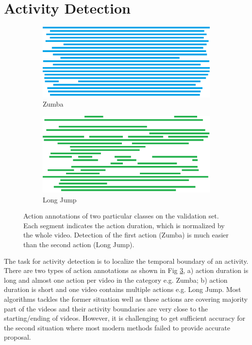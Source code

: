 \section{Activity Detection}
\label{sec:activity_detection}

\begin{figure}
    \centering
    \begin{subfigure}{1\textwidth}
        \includegraphics[width=1\linewidth]{resources/Human_Poses/Zumba}
        \caption{Zumba}
        \label{fig:subfig1}
    \end{subfigure}

    \begin{subfigure}{1\textwidth}
        \includegraphics[width=1\linewidth]{resources/Human_Poses/Long_jump}
        \caption{Long Jump}
        \label{fig:subfig2}
    \end{subfigure}
 \caption{Action annotations of two particular classes on the validation set. Each segment indicates the action duration, which is normalized by the whole video. Detection of the first action (Zumba) is much easier than the second action (Long Jump).}
 
\label{fig:seg} %
\end{figure}

The task for activity detection is to localize the temporal boundary of an activity. There are two types of action annotations as shown in Fig \ref{fig:seg}, a) action duration is long and almost one action per video in the category e.g. Zumba; b) action duration is short and one video contains multiple actions e.g. Long Jump. Most algorithms tackles the former situation well as these actions are covering majority part of the videos and their activity boundaries are very close to the starting/ending of videos. However, it is challenging to get sufficient accuracy for the second situation where most modern methods failed to provide accurate proposal.

